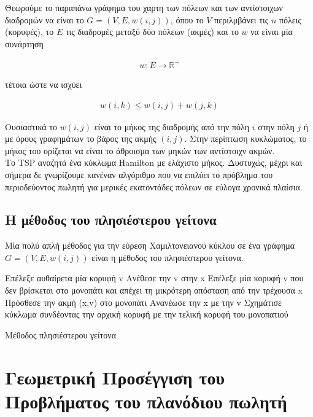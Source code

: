 \documentclass[oneside,12pt]{book}
\newcommand{\R}{\mathbb{R}}
\theoremstyle{definition}
\begin{document}
Θεωρούμε το παραπάνω γράφημα του χαρτη των πόλεων και των αντίστοιχων διαδρομών να είναι το \(G = (V,E,w(i,j))\), όπου το \(V\) περιλμβάνει τις \(n\) πόλεις  (κορυφές), το \(E\) τις διαδρομές μεταξύ δύο πόλεων (ακμές) και το \(w\) να είναι μία συνάρτηση 

\begin{align}
	w:E \rightarrow \R^{+}
\end{align} 
 
τέτοια ώστε να ισχύει 

\begin{align}
	w(i,k) \leq w(i,j) + w(j,k)
\end{align} 

Ουσιαστικά το \(w(i,j)\) είναι το μήκος της διαδρομής από την πόλη \(i\) στην πόλη \(j\) ή με όρους γραφημάτων το βάρος της ακμής \((i,j)\). Στην περίπτωση κυκλώματος, το μήκος του ορίζεται να είναι το άθροισμα των μηκών των αντίστοιχν ακμών. \\

Το TSP αναζητά ένα κύκλωμα Hamilton με ελάχιστο μήκος. Δυστυχώς, μέχρι και σήμερα δε γνωρίζουμε κανέναν αλγόριθμο που να επιλύει το πρόβλημα του περιοδεύοντος πωλητή για μερικές εκατοντάδες πόλεων σε εύλογα χρονικά πλαίσια. \\

\section{Η μέθοδος του πλησιέστερου γείτονα}

Μία πολύ απλή μέθοδος για την εύρεση Χαμιλτονειανού κύκλου σε ένα γράφημα \(G = (V,E,w(i,j))\) είναι η μέθοδος του πλησιέστερου γείτονα. 

\begin{algorithm}[H]
	\SetAlgoLined
	
	Επέλεξε αυθαίρετα μία κορυφή v \;
	Ανέθεσε την v στην x \;
	{Επέλεξε μία κορυφή v που δεν βρίσκεται στο μονοπάτι και απέχει τη μικρότερη απόσταση από την τρέχουσα x \;
	Πρόσθεσε την ακμή (x,v) στο μονοπάτι \;
	Ανανέωσε την x με την v \;}
	Σχημάτισε κύκλωμα συνδέοντας την αρχική κορυφή με την τελική κορυφή του μονοπατιού \;
	
	\caption{Μέθοδος πλησιέστερου γείτονα}
\end{algorithm}

\chapter{Γεωμετρική Προσέγγιση του Προβλήματος του πλανόδιου πωλητή}
\end{document}
